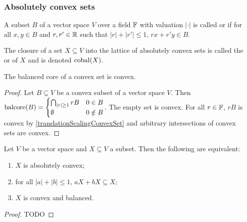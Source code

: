 \subsubsection{Absolutely convex sets}
\begin{definition}
A subset $B$ of a vector space $V$ over a field $\mathbb{F}$ with valuation $|\cdot|$ is called  or  if for all $x,y\in B$ and $r,r'\in \mathbb{R}$ such that $|r| + |r'| \leq 1$, $rx + r'y\in B$.

The closure of a set $X\subseteq V$ into the lattice of absolutely convex sets is called the  or  of $X$ and is denoted $\operatorname{cobal}(X)$.
\end{definition}

\begin{lemma} \label{balancedCoreConvexSet}
The balanced core of a convex set is convex.
\end{lemma}
\begin{proof}
Let $B\subseteq V$ be a convex subset of a vector space $V$. Then
$\operatorname{balcore}(B) = \begin{cases}
\bigcap_{|r|\geq 1}rB & 0\in B\\
\emptyset & 0\notin B
\end{cases}$. The empty set is convex. For all $r\in \mathbb{F}$, $rB$ is convex by \ref{translationScalingConvexSet} and arbitrary intersections of convex sets are convex.
\end{proof}

\begin{lemma} \label{absolutelyConvexCriteria}
Let $V$ be a vector space and $X\subseteq V$ a subset. Then the following are equivalent:
\begin{enumerate}
\item $X$ is absolutely convex;
\item for all $|a|+|b| \leq 1$, $aX +bX \subseteq X$;
\item $X$ is convex and balanced.
\end{enumerate}
\end{lemma}
\begin{proof}
TODO
\end{proof}

